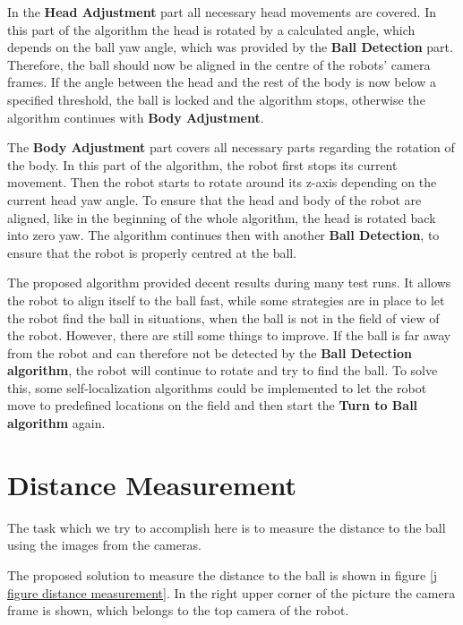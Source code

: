 In the \textbf{Head Adjustment} part all necessary head movements are covered.
In this part of the algorithm the head is rotated by a calculated angle, which
depends on the ball yaw angle, which was provided by the \textbf{Ball
  Detection} part. Therefore, the ball should now be aligned in the centre of
the robots' camera frames. If the angle between the head and the rest of the
body is now below a specified threshold, the ball is locked and the algorithm
stops, otherwise the algorithm continues with \textbf{Body Adjustment}.

The \textbf{Body Adjustment} part covers all necessary parts regarding the
rotation of the body. In this part of the algorithm, the robot first stops its
current movement. Then the robot starts to rotate around its z-axis depending
on the current head yaw angle. To ensure that the head and body of the robot
are aligned, like in the beginning of the whole algorithm, the head is rotated
back into zero yaw. The algorithm continues then with another \textbf{Ball
  Detection}, to ensure that the robot is properly centred at the ball.

The proposed algorithm provided decent results during many test runs. It allows
the robot to align itself to the ball fast, while some strategies are in place
to let the robot find the ball in situations, when the ball is not in the
field of view of the robot. However, there are still some things to improve. If
the ball is far away from the robot and can therefore not be detected by the
\textbf{Ball Detection algorithm}, the robot will continue to rotate and try to
find the ball. To solve this, some self-localization algorithms could be
implemented to let the robot move to predefined locations on the field and then
start the \textbf{Turn to Ball algorithm} again.

\newpage
\section{Distance Measurement}
\label{j sec distance measurement}

The task which we try to accomplish here is to measure the distance to the ball
using the images from the cameras.

The proposed solution to measure the distance to the ball is shown in figure
\ref{j figure distance measurement}. In the right upper corner of the picture
the camera frame is shown, which belongs to the top camera of the robot.

